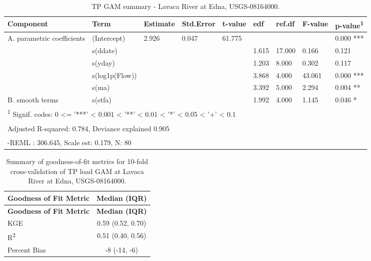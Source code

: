 \documentclass[
]{article}
\newenvironment{widestuff}{\begin{table}[h]\begin{adjustwidth}{-4.5cm}{-4.5cm}\centering}{\end{adjustwidth}\end{table}}
\begin{document}
\begin{widestuff}

\caption{TP GAM summary - Lavaca River at Edna, USGS-08164000.}
\centering
\begin{tabular}[t]{lllllllll}
\toprule
Component & Term & Estimate & Std.Error & t-value & edf & ref.df & F-value & p-value\textsuperscript{1}\\
\midrule
A. parametric coefficients & (Intercept) & 2.926 & 0.047 & 61.775 &  &  &  & 0.000 ***\\
\cmidrule{1-9}
 & s(ddate) &  &  &  & 1.615 & 17.000 & 0.166 & 0.121\\

 & s(yday) &  &  &  & 1.203 & 8.000 & 0.302 & 0.117\\

 & s(log1p(Flow)) &  &  &  & 3.868 & 4.000 & 43.061 & 0.000 ***\\

 & s(ma) &  &  &  & 3.392 & 5.000 & 2.294 & 0.004 **\\

\multirow[t]{-5}{*}{\raggedright\arraybackslash B. smooth terms} & s(stfa) &  &  &  & 1.992 & 4.000 & 1.145 & 0.046 *\\
\bottomrule
\multicolumn{9}{l}{\textsuperscript{1} Signif. codes: 0 <= '***' < 0.001 < '**' < 0.01 < '*' < 0.05 < '+' < 0.1}\\
\multicolumn{9}{l}{\textsuperscript{} Adjusted R-squared: 0.784, Deviance explained 0.905}\\
\multicolumn{9}{l}{\textsuperscript{} -REML : 306.645, Scale est: 0.179, N: 80}\\
\end{tabular}
\end{widestuff}

\hypertarget{tbl-TP308164000-CV}{}
\begin{longtable}[]{@{}lc@{}}
\caption{\label{tbl-TP308164000-CV}Summary of goodness-of-fit metrics
for 10-fold cross-validation of TP load GAM at Lavaca River at Edna,
USGS-08164000.}\tabularnewline
\toprule()
\textbf{Goodness of Fit Metric} & \textbf{Median (IQR)} \\
\midrule()
\endfirsthead
\toprule()
\textbf{Goodness of Fit Metric} & \textbf{Median (IQR)} \\
\midrule()
\endhead
KGE & 0.59 (0.52, 0.70) \\
R\textsuperscript{2} & 0.51 (0.40, 0.56) \\
Percent Bias & -8 (-14, -6) \\
\bottomrule()
\end{longtable}
\end{document}
